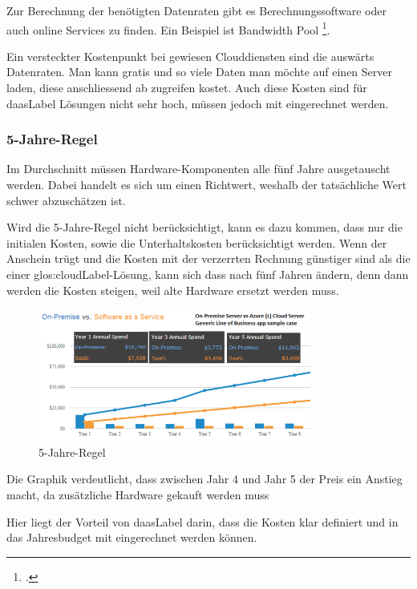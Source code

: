 Zur Berechnung der benötigten Datenraten gibt es Berechnungssoftware oder auch online Services zu finden. Ein Beispiel ist Bandwidth Pool \footcite{What_is_Bandwidth_Pool_Bandwidth_Pool}.

Ein versteckter Kostenpunkt bei gewiesen Clouddiensten sind die auswärts Datenraten. Man kann gratis und so viele Daten man möchte auf einen Server laden, diese anschliessend ab zugreifen kostet.
Auch diese Kosten sind für \Gls{daasLabel} Lösungen nicht sehr hoch, müssen jedoch mit eingerechnet werden.

\subsubsection{5-Jahre-Regel}
Im Durchschnitt müssen Hardware-Komponenten alle fünf Jahre ausgetauscht werden. Dabei handelt es sich um einen Richtwert, weshalb der tatsächliche Wert schwer abzuschätzen ist.

Wird die 5-Jahre-Regel nicht berücksichtigt, kann es dazu kommen, dass nur die initialen Kosten, sowie die Unterhaltskosten berücksichtigt werden.
Wenn der Anschein trügt und die Kosten mit der verzerrten Rechnung günstiger sind als die einer \Gls{glos:cloudLabel}-Lösung, kann sich dass nach fünf Jahren ändern, denn dann werden die Kosten steigen, weil alte Hardware ersetzt werden muss.

\begin{figure}[H]
	\includegraphics[width=0.8\textwidth]{images/five-year-rule}
	\caption{5-Jahre-Regel}
	\label{fig:fiveYearRuleImage}
\end{figure}
Die Graphik verdeutlicht, dass zwischen Jahr 4 und Jahr 5 der Preis ein Anstieg macht, da zusätzliche Hardware gekauft werden muss

Hier liegt der Vorteil von \Gls{daasLabel} darin, dass die Kosten klar definiert und in das Jahresbudget mit eingerechnet werden können.

